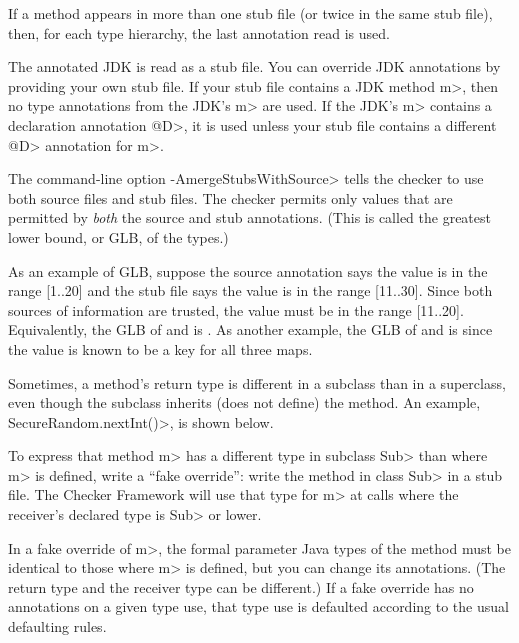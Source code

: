 If a method appears in more than one stub file (or twice in the same
stub file), then, for each type hierarchy, the last annotation read is used.

The annotated JDK is read as a stub file.
You can override JDK annotations by providing your own stub file.
If your stub file contains a JDK method \<m>, then no type annotations from
the JDK's \<m> are used.  If the JDK's \<m> contains a declaration
annotation \<@D>, it is used unless your stub file contains a different
\<@D> annotation for \<m>.

The command-line option \<-AmergeStubsWithSource> tells the checker to use
both source files and stub files.  The checker permits only values that are
permitted by \emph{both} the source and stub annotations.  (This is called
the greatest lower bound, or GLB, of the types.)

As an example of GLB, suppose the source annotation says the value is in
the range [1..20] and the stub file says the value is in the range
[11..30].  Since both sources of information are trusted, the value must be
in the range [11..20].  Equivalently, the GLB of
 and
 is
.
As another example, the GLB of
 and
 is
since the value is known to be a key for all three maps.



Sometimes, a method's return type is different in a subclass than in a
superclass, even though the subclass inherits (does not define) the method.
An example, \<SecureRandom.nextInt()>, is shown below.

To express that method \<m> has a different type in subclass \<Sub> than
where \<m> is defined, write a ``fake override'':  write the method in
class \<Sub> in a stub file.  The Checker Framework will use that type for
\<m> at calls where the receiver's declared type is \<Sub> or lower.

In a fake override of \<m>, the formal parameter Java types of the method
must be identical to those where \<m> is defined, but you can change its
annotations.  (The return type and the receiver type can be different.)
If a fake override has no annotations on a given type use, that type use is
defaulted according to the usual defaulting rules.

